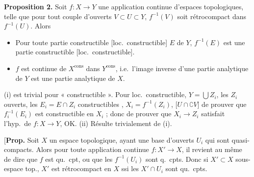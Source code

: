 \documentclass[11pt,a4paper]{article}
\begin{document}
\textbf{Proposition 2.} Soit $f:X\to Y$ une application continue d'espaces topologiques, telle que  pour tout couple d'ouverts $V\subset U\subset Y$,   $f^{-1}(V)$ soit rétrocompact dans  $f^{-1}(U)$. Alors
\begin{itemize}
\item[(i)] Pour toute partie constructible [loc.\ constructible]  $E$ de $Y$, $f^{-1}(E)$ est une partie constructible [loc.\ constructible].
\item[(ii)] $f$ est continue de $X^{\mathrm{cons}}$ dans $Y^{\mathrm{cons}}$, i.e.\ l'image inverse d'une partie  analytique de $Y$ est une partie  analytique de $X$.
\end{itemize}

(i) est trivial pour « constructible ». Pour loc.\ constructible, \ill{} \ill{} \ill{} \ill{} $Y=\bigcup Z_i$, les $Z_i$ ouverts, les $E_i=E\cap Z_i$ constructibles ,   $X_i=f^{-1}(Z_i)$, [$U\cap\complement V$] \ill{} de prouver que $f_i^{-1}(E_i)$ est constructible en $X_i$ ; donc de prouver que $X_i\to Z_i$ satisfait l'hyp.\ de $f:X\to Y$,  OK.
(ii) Résulte trivialement de (i).


[\textbf{Prop.} Soit $X$ un espace topologique, ayant une base d'ouverts $U_i$ qui sont quasi-compacts. Alors pour toute  application continue $f:X'\to X$, il revient au même de dire que $f$ est qu.\ cpt, ou que les $f^{-1}(U_i)$ sont q.\ cpts. Donc si $X'\subset X$ sous-espace top., $X'$ est rétrocompact en $X$ ssi les $X'\cap U_i$ sont qu.\ cpts.
\end{document}
